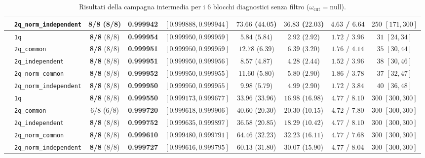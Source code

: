 \documentclass[11pt,a4paper]{article}
\begin{document}
\begin{table}[H]
{\begin{tabular}{llccccccc}
 & \texttt{2q\_norm\_independent} & \textbf{8/8} (8/8) & \textbf{0.999942} & $[0.999888, 0.999944]$ & $73.66$ ($44.05$) & $36.83$ ($22.03$) & $4.63$ / $6.64$ & $250$ $[171, 300]$ \\
\midrule
{}
 & \texttt{1q} & \textbf{8/8} (8/8) & \textbf{0.999954} & $[0.999950, 0.999959]$ & $5.84$ ($5.84$) & $2.92$ ($2.92$) & $1.72$ / $3.96$ & $31$ $[24, 34]$ \\
 & \texttt{2q\_common} & \textbf{8/8} (8/8) & \textbf{0.999951} & $[0.999950, 0.999959]$ & $12.78$ ($6.39$) & $6.39$ ($3.20$) & $1.76$ / $4.14$ & $35$ $[30, 44]$ \\
 & \texttt{2q\_independent} & \textbf{8/8} (8/8) & \textbf{0.999951} & $[0.999950, 0.999956]$ & $8.57$ ($4.87$) & $4.28$ ($2.44$) & $1.52$ / $3.96$ & $38$ $[30, 46]$ \\
 & \texttt{2q\_norm\_common} & \textbf{8/8} (8/8) & \textbf{0.999952} & $[0.999950, 0.999955]$ & $11.60$ ($5.80$) & $5.80$ ($2.90$) & $1.86$ / $3.78$ & $37$ $[32, 47]$ \\
 & \texttt{2q\_norm\_independent} & \textbf{8/8} (8/8) & \textbf{0.999950} & $[0.999950, 0.999955]$ & $9.98$ ($5.79$) & $4.99$ ($2.90$) & $1.72$ / $3.84$ & $40$ $[36, 48]$ \\
\midrule
{}
 & \texttt{1q} & \textbf{8/8} (8/8) & \textbf{0.999550} & $[0.999173, 0.999677]$ & $33.96$ ($33.96$) & $16.98$ ($16.98$) & $4.77$ / $8.10$ & $300$ $[300, 300]$ \\
 & \texttt{2q\_common} & 6/8 (6/8) & \textbf{0.999720} & $[0.999618, 0.999906]$ & $40.60$ ($20.30$) & $20.30$ ($10.15$) & $4.72$ / $7.80$ & $300$ $[300, 300]$ \\
 & \texttt{2q\_independent} & \textbf{8/8} (8/8) & \textbf{0.999752} & $[0.999635, 0.999897]$ & $36.58$ ($20.85$) & $18.29$ ($10.42$) & $4.77$ / $8.10$ & $300$ $[300, 300]$ \\
 & \texttt{2q\_norm\_common} & \textbf{8/8} (8/8) & \textbf{0.999610} & $[0.999480, 0.999791]$ & $64.46$ ($32.23$) & $32.23$ ($16.11$) & $4.77$ / $7.68$ & $300$ $[300, 300]$ \\
 & \texttt{2q\_norm\_independent} & \textbf{8/8} (8/8) & \textbf{0.999727} & $[0.999616, 0.999795]$ & $60.13$ ($31.80$) & $30.07$ ($15.90$) & $4.77$ / $8.04$ & $300$ $[300, 300]$ \\
\bottomrule
\end{tabular}%
}
\caption{Risultati della campagna intermedia per i 6 blocchi diagnostici senza filtro ($\omega_{\text{cut}} = \text{null}$).}
\label{tab:intermedia_nofiltro}
\end{table}
\end{document}
